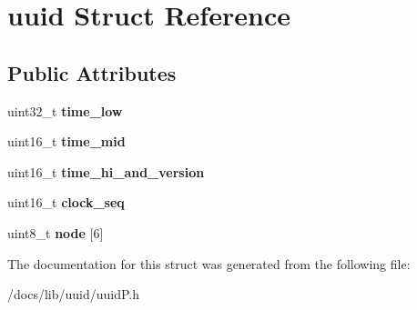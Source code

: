 \hypertarget{structuuid}{}\section{uuid Struct Reference}
\label{structuuid}
\subsection*{Public Attributes}
\begin{DoxyCompactItemize}
\item 
\mbox{\label{structuuid_aeabb39e916355b8a0cdd8912e8c27317}} 
uint32\+\_\+t {\bfseries time\+\_\+low}
\item 
\mbox{\label{structuuid_a0b92f5d247288e1db17317232ae29694}} 
uint16\+\_\+t {\bfseries time\+\_\+mid}
\item 
\mbox{\label{structuuid_ac89486073118cbca117c9204aeecb9d4}} 
uint16\+\_\+t {\bfseries time\+\_\+hi\+\_\+and\+\_\+version}
\item 
\mbox{\label{structuuid_a32dab4fbd7eae652430523ef77d477ff}} 
uint16\+\_\+t {\bfseries clock\+\_\+seq}
\item 
\mbox{\label{structuuid_a2d6a632649ae128bc68dc0a7c154b3ba}} 
uint8\+\_\+t {\bfseries node} \mbox{[}6\mbox{]}
\end{DoxyCompactItemize}


The documentation for this struct was generated from the following file\+:\begin{DoxyCompactItemize}
\item 
/docs/lib/uuid/uuid\+P.\+h\end{DoxyCompactItemize}

